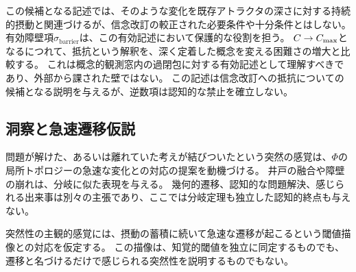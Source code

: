 この候補となる記述では、そのような変化を既存アトラクタの深さに対する持続的摂動と関連づけるが、信念改訂の較正された必要条件や十分条件とはしない。
有効障壁項$\sigma_{\mathrm{barrier}}$は、この有効記述において保護的な役割を担う。
$C\to C_{\max}$となるにつれて、抵抗という解釈を、深く定着した概念を変える困難さの増大と比較する。
これは概念的観測窓内の過閉包に対する有効記述として理解すべきであり、外部から課された壁ではない。
この記述は信念改訂への抵抗についての候補となる説明を与えるが、逆数項は認知的な禁止を確立しない。

\subsection{洞察と急速遷移仮説}
問題が解けた、あるいは離れていた考えが結びついたという突然の感覚は、$\Phi$の局所トポロジーの急速な変化との対応の提案を動機づける。
井戸の融合や障壁の崩れは、分岐に似た表現を与える。
幾何的遷移、認知的な問題解決、感じられる出来事は別々の主張であり、ここでは分岐定理も独立した認知的終点も与えない。

突然性の主観的感覚には、摂動の蓄積に続いて急速な遷移が起こるという閾値描像との対応を仮定する。
この描像は、知覚的閾値を独立に同定するものでも、遷移と名づけるだけで感じられる突然性を説明するものでもない。
